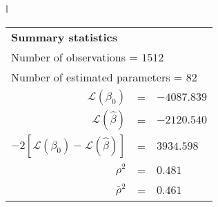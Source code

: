 \begin{tabular}{l}
\begin{tabular}{rcl}
\multicolumn{3}{l}{\bf Summary statistics}\\
\multicolumn{3}{l}{ Number of observations = $1512$} \\
\multicolumn{3}{l}{ Number of estimated  parameters = $82$} \\
 $\mathcal{L}(\beta_0)$ &=&  $-4087.839$ \\
 $\mathcal{L}(\hat{\beta})$ &=& $-2120.540 $  \\
 $-2[\mathcal{L}(\beta_0) -\mathcal{L}(\hat{\beta})]$ &=& $3934.598$ \\
    $\rho^2$ &=&   $0.481$ \\
    $\bar{\rho}^2$ &=&    $0.461$ \\
\end{tabular}
  \end{tabular}
